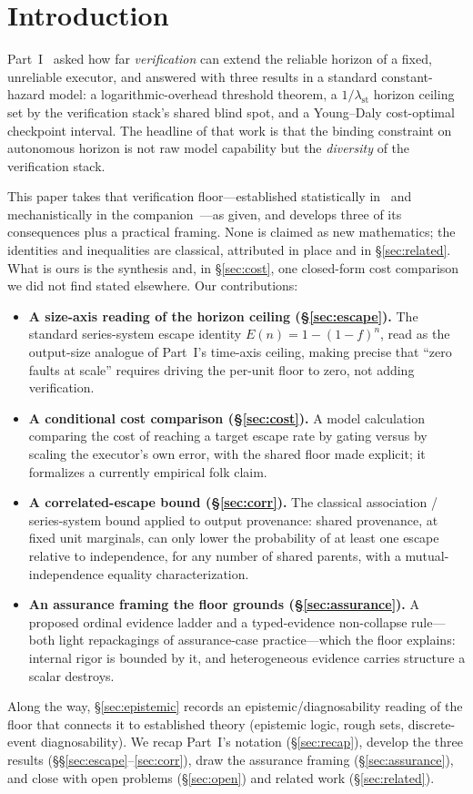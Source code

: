 \documentclass[11pt]{article}
\theoremstyle{definition}
\theoremstyle{remark}
\newcommand{\lst}{\lambda_{\mathrm{st}}}
\newcommand{\Esc}{E}
\newcommand{\fesc}{f}
\begin{document}
\section{Introduction}
Part~I~\cite{matijasevic2026n1} asked how far \emph{verification} can extend the reliable horizon of
a fixed, unreliable executor, and answered with three results in a standard constant-hazard model:
a logarithmic-overhead threshold theorem, a $1/\lst$ horizon ceiling set by the verification stack's
shared blind spot, and a Young--Daly cost-optimal checkpoint interval.
The headline of that work is that the binding constraint on autonomous horizon is not raw model
capability but the \emph{diversity} of the verification stack.

This paper takes that verification floor---established statistically in~\cite{matijasevic2026n1} and
mechanistically in the companion~\cite{matijasevic2026gg}---as given, and develops three of its
consequences plus a practical framing. None is claimed as new mathematics; the identities and
inequalities are classical, attributed in place and in \S\ref{sec:related}. What is ours is the
synthesis and, in \S\ref{sec:cost}, one closed-form cost comparison we did not find stated elsewhere.
Our contributions:
\begin{itemize}[leftmargin=1.4em,itemsep=2pt]
\item \textbf{A size-axis reading of the horizon ceiling (\S\ref{sec:escape}).} The standard
series-system escape identity $\Esc(n)=1-(1-\fesc)^n$, read as the output-size analogue of Part~I's
time-axis ceiling, making precise that ``zero faults at scale'' requires driving the per-unit floor to
zero, not adding verification.
\item \textbf{A conditional cost comparison (\S\ref{sec:cost}).} A model calculation comparing the cost
of reaching a target escape rate by gating versus by scaling the executor's own error, with the shared
floor made explicit; it formalizes a currently empirical folk claim.
\item \textbf{A correlated-escape bound (\S\ref{sec:corr}).} The classical association / series-system
bound applied to output provenance: shared provenance, at fixed unit marginals, can only lower the
probability of at least one escape relative to independence, for any number of shared parents, with a
mutual-independence equality characterization.
\item \textbf{An assurance framing the floor grounds (\S\ref{sec:assurance}).} A proposed ordinal
evidence ladder and a typed-evidence non-collapse rule---both light repackagings of assurance-case
practice---which the floor explains: internal rigor is bounded by it, and heterogeneous evidence
carries structure a scalar destroys.
\end{itemize}
Along the way, \S\ref{sec:epistemic} records an epistemic/diagnosability reading of the floor that
connects it to established theory (epistemic logic, rough sets, discrete-event diagnosability). We
recap Part~I's notation (\S\ref{sec:recap}), develop the three results
(\S\S\ref{sec:escape}--\ref{sec:corr}), draw the assurance framing (\S\ref{sec:assurance}), and close
with open problems (\S\ref{sec:open}) and related work (\S\ref{sec:related}).
\end{document}
